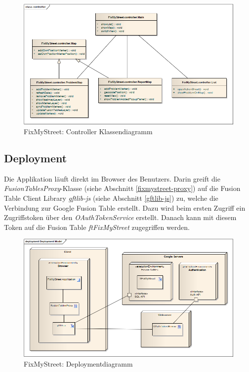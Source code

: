 \begin{figure}[H]
	\centering
	\includegraphics[width=\textwidth]{images/usecase2-fixmystreet/uml/fixmystreet-controller-classmodel}
	\caption{FixMyStreet: Controller Klassendiagramm}
	\label{fixmystreet-controller-classmodel}
\end{figure}

\subsection{Deployment}
Die Applikation läuft direkt im Browser des Benutzers. Darin greift die \emph{FusionTablesProxy}-Klasse (siehe Abschnitt \ref{fixmystreet-proxy}) auf die Fusion Table Client Library \emph{gftlib-js} (siehe Abschnitt \ref{gftlib-js}) zu, welche die Verbindung zur Google Fusion Table erstellt. Dazu wird beim ersten Zugriff ein Zugriffstoken über den \emph{OAuthTokenService} erstellt. Danach kann mit diesem Token auf die Fusion Table \emph{ftFixMyStreet} zugegriffen werden.

\begin{figure}[H]
	\centering
	\includegraphics[width=\textwidth]{images/usecase2-fixmystreet/uml/fixmystreet-deploymentmodel}
	\caption{FixMyStreet: Deploymentdiagramm}
	\label{fixmystreet-deploymentmodel}
\end{figure}

